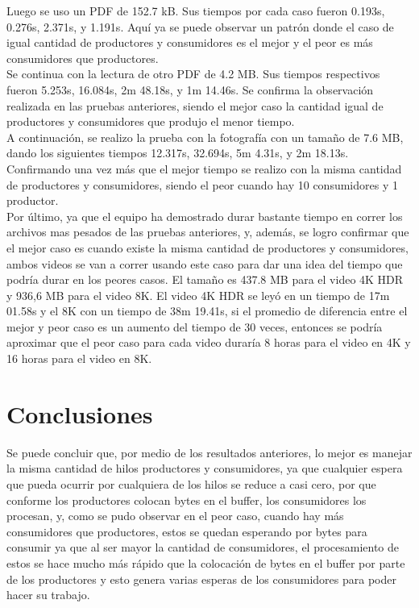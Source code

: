 \documentclass[10pt, article, natbib]{IEEEtran}
\begin{document}
Luego se uso un PDF de 152.7 kB. Sus tiempos por cada caso fueron 0.193s, 0.276s, 2.371s, y 1.191s. Aquí ya se puede observar un patrón donde el caso de igual cantidad de productores y consumidores es el mejor y el peor es más consumidores que productores.\\

Se continua con la lectura de otro PDF de 4.2 MB. Sus tiempos respectivos fueron 5.253s, 16.084s, 2m 48.18s, y 1m 14.46s. Se confirma la observación realizada en las pruebas anteriores, siendo el mejor caso la cantidad igual de productores y consumidores que produjo el menor tiempo.\\

A continuación, se realizo la prueba con la fotografía con un tamaño de 7.6 MB, dando los siguientes tiempos 12.317s, 32.694s, 5m 4.31s, y 2m 18.13s. Confirmando una vez más que el mejor tiempo se realizo con la misma cantidad de productores y consumidores, siendo el peor cuando hay 10 consumidores y 1 productor.\\

Por último, ya que el equipo ha demostrado durar bastante tiempo en correr los archivos mas pesados de las pruebas anteriores, y, además, se logro confirmar que el mejor caso es cuando existe la misma cantidad de productores y consumidores, ambos videos se van a correr usando este caso para dar una idea del tiempo que podría durar en los peores casos. El tamaño es 437.8 MB para el video 4K HDR y 936,6 MB para el video 8K. El video 4K HDR se leyó en un tiempo de 17m 01.58s y el 8K con un tiempo de 38m 19.41s, si el promedio de diferencia entre el mejor y peor caso es un aumento del tiempo de 30 veces, entonces se podría aproximar que el peor caso para cada video duraría 8 horas para el video en 4K y 16 horas para el video en 8K.\\

\section{Conclusiones}
Se puede concluir que, por medio de los resultados anteriores, lo mejor es manejar la misma cantidad de hilos productores y consumidores, ya que cualquier espera que pueda ocurrir por cualquiera de los hilos se reduce a casi cero, por que conforme los productores colocan bytes en el buffer, los consumidores los procesan, y, como se pudo observar en el peor caso, cuando hay más consumidores que productores, estos se quedan esperando por bytes para consumir ya que al ser mayor la cantidad de consumidores, el procesamiento de estos se hace mucho más rápido que la colocación de bytes en el buffer por parte de los productores y esto genera varias esperas de los consumidores para poder hacer su trabajo.\\
\end{document}
